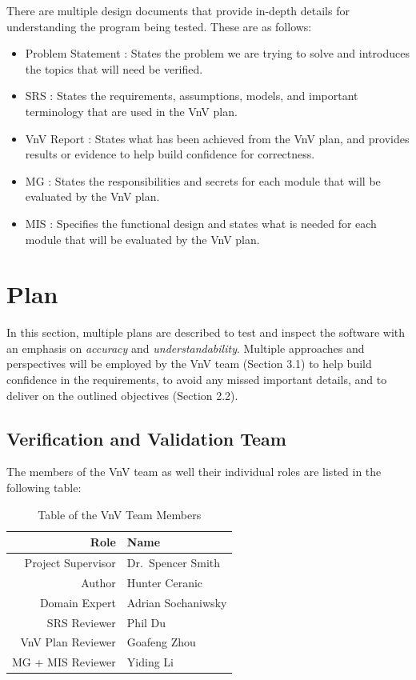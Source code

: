 \documentclass[12pt, titlepage]{article}
\begin{document}
There are multiple design documents that provide in-depth details for understanding
the program being tested. These are as follows:

\begin{itemize}
  \item Problem Statement \citep{Prob_Statement}: States the problem we are trying to solve
    and introduces the topics that will need be verified.
  \item SRS \citep{SRS}: States the requirements, assumptions, models, and important 
  terminology that are used in the VnV plan.
  \item VnV Report \citep{VnV_report}: States what has been achieved from the VnV plan,
    and provides results or evidence to help build confidence for correctness.
  \item MG \citep{MG}: States the responsibilities and secrets for each module that will
    be evaluated by the VnV plan.
  \item MIS \citep{MIS}: Specifies the functional design and states what is needed for each
    module that will be evaluated by the VnV plan.
\end{itemize}

\section{Plan}

In this section, multiple plans are described to test and inspect the software with an emphasis 
on \textit{accuracy} and \textit{understandability}. Multiple approaches and perspectives will be employed by the VnV team (Section 3.1)
to help build confidence in the requirements, to avoid any missed important details, 
and to deliver on the outlined objectives (Section 2.2).

\subsection{Verification and Validation Team}

The members of the VnV team as well their individual roles are listed in the following table:

\begin{table}[h!]
  \centering
  \begin{tabular}{|r|l|}
    \hline
    \textbf{Role} & \textbf{Name} \\ \hline
    Project Supervisor & Dr.\ Spencer Smith  \\ \hline
    Author             & Hunter Ceranic      \\ \hline
    Domain Expert      & Adrian Sochaniwsky  \\ \hline
    SRS Reviewer       & Phil Du             \\ \hline
    VnV Plan Reviewer  & Goafeng Zhou        \\ \hline
    MG + MIS Reviewer  & Yiding Li           \\ \hline
  \end{tabular}
  \caption{Table of the VnV Team Members}
  \label{table_vnv_team}
\end{table}
\end{document}
